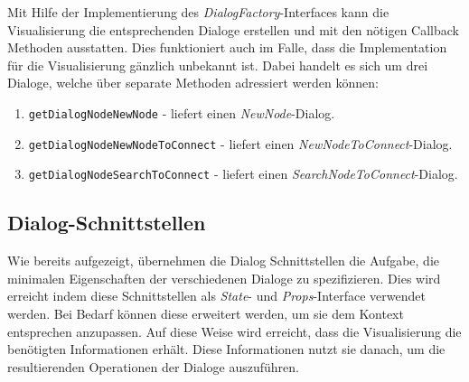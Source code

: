 Mit Hilfe der Implementierung des \textit{DialogFactory}-Interfaces kann die Visualisierung die entsprechenden Dialoge erstellen und mit den nöt\-igen \gls{Callback} Methoden ausstatten. Dies funktioniert auch im Falle, dass die Implementation für die Visualisierung gänzlich unbekannt ist. Dabei handelt es sich um drei Dialoge, welche über separate Methoden adressiert werden können:

\begin{enumerate}
  \item \texttt{getDialogNodeNewNode} - liefert einen \textit{NewNode}-Dialog.
  \item \texttt{getDialogNodeNewNodeToConnect} - liefert einen \textit{New\-Node\-To\-Con\-nect}-Dialog.
  \item \texttt{getDialogNodeSearchToCon\-nect} - liefert einen \textit{Search\-Node\-To\-Con\-nect}-Dialog.
\end{enumerate}


\subsection{Dialog-Schnittstellen}
\label{subsec:dialoginterfaces}
Wie bereits aufgezeigt, übernehmen die Dialog Schnittstellen die Aufgabe, die minimalen Eigenschaften der verschiedenen Dialoge zu spezifizieren. Dies wird erreicht indem diese Schnittstellen als \textit{State}- und \textit{Props}-Interface verwendet werden.
Bei Bedarf können diese erweitert werden, um sie dem Kontext entsprechen anzupassen. Auf diese Weise wird erreicht, dass die Visualisierung die benötigten Informationen erhält. Diese Informationen nutzt sie danach, um die resultierenden Operationen der Dialoge auszuführen.

